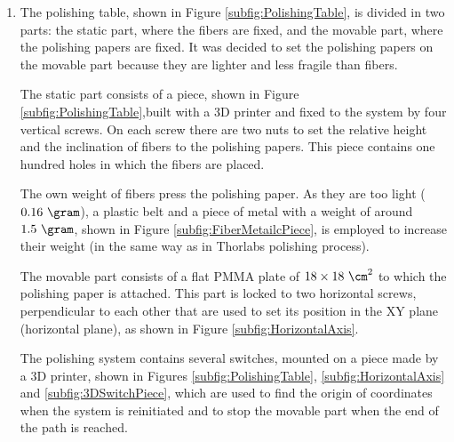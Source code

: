 \begin{enumerate}
\item{} The polishing table, shown in Figure \ref{subfig:PolishingTable}, is divided in two parts: the static part, where the fibers are fixed, and the movable part, where the polishing papers are fixed. It was decided to set the polishing papers on the movable part because they are lighter and less fragile than fibers.

The static part consists of a piece, shown in Figure \ref{subfig:PolishingTable},built with a 3D printer and fixed to the system by four vertical screws. On each screw there are two nuts to set the relative height and the inclination of fibers to the polishing papers. This piece contains one hundred holes in which the fibers are placed. 

The own weight of fibers press the polishing paper. As they are too light ($0.16~\gram$), a plastic belt and a piece of metal with a weight of around $1.5~\gram$, shown in Figure \ref{subfig:FiberMetailcPiece}, is employed to increase their weight (in the same way as in Thorlabs polishing process).

The movable part consists of a flat PMMA plate of $18 \times 18~\cm^2$ to which the polishing paper is attached. This part is locked to two horizontal screws, perpendicular to each other that are used to set its position in the XY plane (horizontal plane), as shown in Figure \ref{subfig:HorizontalAxis}.

The polishing system contains several switches,  mounted on a piece made by a 3D printer, shown in Figures \ref{subfig:PolishingTable}, \ref{subfig:HorizontalAxis} and \ref{subfig:3DSwitchPiece}, which are used to find the origin of coordinates when the system is reinitiated and to stop the movable part when the end of the path is reached. 


\end{enumerate}
